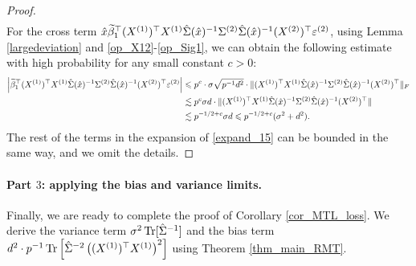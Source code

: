 \begin{proof}
\begin{align*}
\end{align*} 
For the cross term $\hat x \widetilde \beta_1^\top (X^{(1)})^\top X^{(1)} \hat \Sigma(\hat x)^{-1}  \Sigma^{(2)} \hat \Sigma(\hat x)^{-1}  (X^{(2)})^\top  \varepsilon^{(2)}$, using Lemma \ref{largedeviation} and \eqref{op_X12}-\eqref{op_Sig1}, we can obtain the following estimate with high probability for any small constant $c>0$:
\begin{align*}
 \left|\widetilde \beta_1^\top (X^{(1)})^\top X^{(1)} \hat \Sigma(\hat x)^{-1}  \Sigma^{(2)} \hat \Sigma(\hat x)^{-1}  (X^{(2)})^\top  \varepsilon^{(2)}\right|  & \leqslant p^c \cdot \sigma\sqrt{p^{-1}d^2} \cdot \|(X^{(1)})^\top X^{(1)} \hat \Sigma(\hat x)^{-1}  \Sigma^{(2)} \hat \Sigma(\hat x)^{-1}  (X^{(2)})^\top  \|_F \\
&\lesssim p^{c}\sigma d \cdot  \|(X^{(1)})^\top X^{(1)} \hat \Sigma(\hat x)^{-1}  \Sigma^{(2)} \hat \Sigma(\hat x)^{-1}  (X^{(2)})^\top  \| \\
&\lesssim p^{-1/2+c}\sigma d\leqslant p^{-1/2+c}(\sigma^2+ d^2).
\end{align*}
The rest of the terms in the expansion of \eqref{expand_15} can be bounded in the same way, and we omit the details.
 \end{proof}
  
\paragraph{Part $3$: applying the bias and variance limits.}
Finally, we are ready to complete the proof of Corollary \ref{cor_MTL_loss}.
We derive the variance term $\sigma^2  \operatorname{Tr}[\hat\Sigma^{-1}]$ and the bias term $d^2\cdot {p}^{-1}\operatorname{Tr}\left[\hat\Sigma^{-2} \left((X^{(1)})^\top X^{(1)} \right)^2\right]$ using Theorem \ref{thm_main_RMT}.

